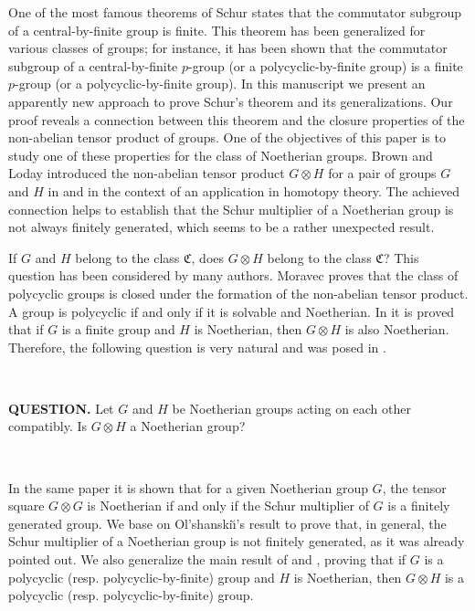 \documentclass[12pt,reqno]{amsart}
\theoremstyle{definition}
\numberwithin{equation}{section}
\theoremstyle{definition}
\begin{document}
One of the most famous theorems of Schur states that the commutator subgroup of a central-by-finite group is finite. This theorem has been generalized
for various classes of groups; for instance, it has been shown that the commutator subgroup of a central-by-finite $p$-group (or a polycyclic-by-finite group)
is a finite $p$-group (or a polycyclic-by-finite group). In this manuscript we present an apparently new approach to prove Schur's theorem and
its generalizations. Our proof reveals a connection between this theorem and the closure properties of the non-abelian tensor product of groups.
One of the objectives of this paper is to study one of these properties for the class of Noetherian groups.
 Brown and  Loday introduced the non-abelian tensor product $G\otimes H$ for a pair of groups $G$ and $H$ in \cite{BroLod84} and \cite{BroLod87}
  in the context of an application in homotopy theory.
The achieved connection
helps to establish that the Schur multiplier of a Noetherian group is not always finitely generated, which seems to be a rather unexpected result.



If $G$ and $H$ belong to the class $\mathfrak{C}$, does $G\otimes H$ belong to the class $\mathfrak{C}$?
This question has been considered by many authors. Moravec \cite{Mo07} proves that the class of polycyclic groups  is closed under
the formation of the non-abelian tensor product.
 A group is polycyclic if and only if it is solvable and Noetherian. In \cite{DLT}  it is proved that if $G$ is a finite group and $H$ is Noetherian,
  then $G\otimes H$ is also Noetherian. Therefore, the following question is very natural and was posed in \cite{DLT}.



\

{\bf QUESTION.} Let $G$ and $H$ be Noetherian groups acting on each other compatibly. Is $G\otimes H$ a Noetherian group?

\

In the same paper it is shown that for a given Noetherian group $G$, the tensor square $G\otimes G$ is Noetherian if and only if
the Schur multiplier of $G$ is a finitely generated group. We base on Ol'shanski\u\i's result \cite{Olsh} to prove that, in general, the Schur multiplier of a
Noetherian group is not finitely generated, as it was already pointed out. We also generalize the main result of \cite{Mo07} and \cite[Theorem 5.11]{DLT},
proving that if $G$ is a polycyclic (resp. polycyclic-by-finite) group and $H$ is Noetherian, then $G\otimes H$ is a polycyclic (resp. polycyclic-by-finite) group.
\end{document}
